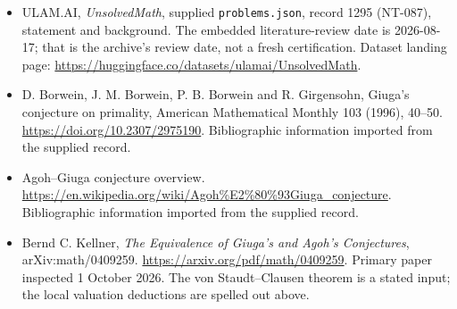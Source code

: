 \documentclass[11pt,a4paper]{article}
\begin{document}
{\small

\begin{itemize}

\item[\hypertarget{source:1295:1}{S1}] ULAM.AI, \emph{UnsolvedMath}, supplied \texttt{problems.json}, record 1295 (NT-087), statement and background. The embedded literature-review date is 2026-08-17; that is the archive’s review date, not a fresh certification. Dataset landing page: \url{https://huggingface.co/datasets/ulamai/UnsolvedMath}.

\item[\hypertarget{source:1295:2}{S2}] D. Borwein, J. M. Borwein, P. B. Borwein and R. Girgensohn, Giuga's conjecture on primality, American Mathematical Monthly 103 (1996), 40--50. \url{https://doi.org/10.2307/2975190}. Bibliographic information imported from the supplied record.

\item[\hypertarget{source:1295:3}{S3}] Agoh--Giuga conjecture overview. \url{https://en.wikipedia.org/wiki/Agoh%E2%80%93Giuga_conjecture}. Bibliographic information imported from the supplied record.


\item[E1] Bernd C. Kellner, \emph{The Equivalence of Giuga's and
Agoh's Conjectures}, arXiv:math/0409259.
\url{https://arxiv.org/pdf/math/0409259}.
Primary paper inspected 1 October 2026. The von Staudt--Clausen theorem
is a stated input; the local valuation deductions are spelled out above.

\end{itemize}

}

\label{end:1295}
\end{document}
